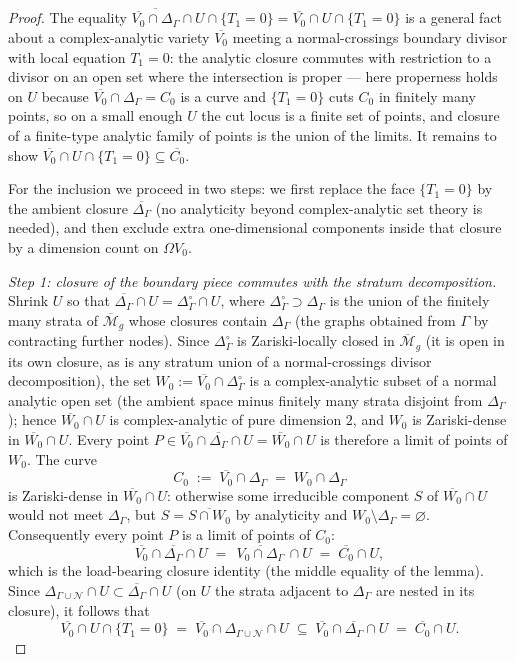 \documentclass[11pt]{article}
\newcommand{\M}{\mathcal{M}}
\theoremstyle{definition}
\theoremstyle{remark}
\begin{document}
\begin{proof}
The equality $\overline{\overline{V_0}\cap\Delta_\Gamma}\cap U\cap
\{T_1=0\} = \overline{V_0}\cap U\cap\{T_1=0\}$ is a general fact about a
complex-analytic variety $\overline{V_0}$ meeting a normal-crossings
boundary divisor with local equation $T_1 = 0$: the analytic closure
commutes with restriction to a divisor on an open set where the
intersection is proper --- here properness holds on $U$ because
$\overline{V_0} \cap \Delta_\Gamma = C_0$ is a curve and $\{T_1 = 0\}$
cuts $C_0$ in finitely many points, so on a small enough $U$ the cut
locus is a finite set of points, and closure of a finite-type analytic
family of points is the union of the limits. It remains to show
$\overline{V_0} \cap U \cap \{T_1 = 0\} \subseteq \overline{C_0}$.

For the inclusion we proceed in two steps: we first replace the face
$\{T_1 = 0\}$ by the ambient closure $\overline{\Delta_\Gamma}$
(no analyticity beyond complex-analytic set theory is needed), and
then exclude extra one-dimensional components inside that closure by
a dimension count on $\Omega V_0$.

\emph{Step 1: closure of the boundary piece commutes with the stratum
decomposition.} Shrink $U$ so that
$\overline{\Delta_\Gamma} \cap U = \Delta_\Gamma^\circ \cap U$, where
$\Delta_\Gamma^\circ \supset \Delta_\Gamma$ is the union of the
finitely many strata of $\overline{\M}_g$ whose closures contain
$\Delta_\Gamma$ (the graphs obtained from $\Gamma$ by contracting
further nodes). Since
$\Delta_\Gamma^\circ$ is Zariski-locally closed in $\overline{\M}_g$
(it is open in its own closure, as is any stratum union of a
normal-crossings divisor decomposition), the set
$W_0 := \overline{V_0}\cap\Delta_\Gamma^\circ$ is a
complex-analytic subset of a normal analytic open set (the ambient
space minus finitely many strata disjoint from $\Delta_\Gamma$);
hence $\overline{W_0}\cap U$ is complex-analytic of pure dimension
$2$, and $W_0$ is Zariski-dense in $\overline{W_0}\cap U$. Every
point $P \in \overline{V_0}\cap\overline{\Delta_\Gamma}\cap U =
\overline{W_0} \cap U$ is therefore a limit of points of $W_0$. The
curve
\[
C_0 \;:=\; \overline{V_0}\cap\Delta_\Gamma \;=\; W_0 \cap
\Delta_\Gamma
\]
is Zariski-dense in $\overline{W_0}\cap U$: otherwise some
irreducible component $S$ of $\overline{W_0}\cap U$ would not meet
$\Delta_\Gamma$, but $S = \overline{S\cap W_0}$ by analyticity and
$W_0 \setminus \Delta_\Gamma = \varnothing$. Consequently every point
$P$ is a limit of points of $C_0$:
\[
\overline{V_0}\cap\overline{\Delta_\Gamma}\cap U
\;=\; \overline{\,V_0\cap\Delta_\Gamma\,}\cap U
\;=\; \overline{C_0}\cap U ,
\]
which is the load-bearing closure identity (the middle equality of
the lemma). Since $\Delta_{\Gamma\cup\mathcal N}\cap U \subset
\overline{\Delta_\Gamma}\cap U$ (on $U$ the strata adjacent to
$\Delta_\Gamma$ are nested in its closure), it follows that
\[
\overline{V_0}\cap U \cap \{T_1 = 0\}
\;=\; \overline{V_0}\cap\Delta_{\Gamma\cup\mathcal N}\cap U
\;\subseteq\; \overline{V_0}\cap\overline{\Delta_\Gamma}\cap U
\;=\; \overline{C_0}\cap U .
\]


\end{proof}
\end{document}
